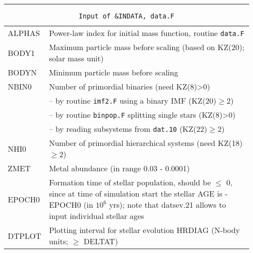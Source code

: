 \hrule
\noindent
\begin{longtable}{@{}p{1.5cm}p{13.0cm}}
\caption{\texttt{Input of \&INDATA, data.F}}
\label{table:indata}\\\hline
%
ALPHAS  & Power-law index for initial mass function, routine \texttt{data.F}\\
BODY1   & Maximum particle mass before scaling (based on KZ(20); solar mass unit)\\
BODYN   & Minimum particle mass before scaling\\
NBIN0   & Number of primordial binaries (need KZ(8)>0) \\
        & -- by routine \texttt{imf2.F} using a binary IMF (KZ(20)$\ge$2)\\
        & -- by routine \texttt{binpop.F} splitting single stars (KZ(8)>0)\\
        & -- by reading subsystems from \texttt{dat.10} (KZ(22)$\ge$2)\\
NHI0    & Number of primordial hierarchical systems (need KZ(18)$\ge$2)\\
ZMET    & Metal abundance (in range 0.03 - 0.0001) \\
EPOCH0  & Formation time of stellar population, should be $\le$ 0, since at time of simulation start the stellar AGE is -EPOCH0 (in $10^6$ yrs); note that datsev.21 allows to input individual stellar ages \\
DTPLOT  & Plotting interval for stellar evolution HRDIAG (N-body units; $\ge$ DELTAT) \\
\end{longtable}

